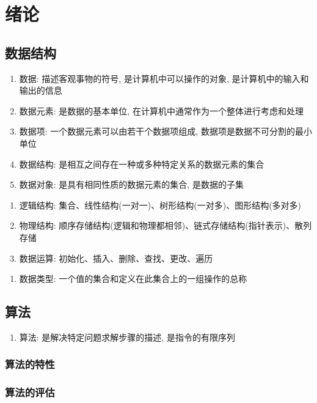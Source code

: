 \chapter{绪论}
\section{数据结构}
\begin{definition}[基本术语]
    \begin{enumerate}
        \item 数据: 描述客观事物的符号, 是计算机中可以操作的对象, 是计算机中的输入和输出的信息
        \item 数据元素: 是数据的基本单位, 在计算机中通常作为一个整体进行考虑和处理
        \item 数据项: 一个数据元素可以由若干个数据项组成, 数据项是数据不可分割的最小单位
        \item 数据结构: 是相互之间存在一种或多种特定关系的数据元素的集合
        \item 数据对象: 是具有相同性质的数据元素的集合, 是数据的子集
    \end{enumerate}
\end{definition}

\begin{definition}[数据结构三要素]
    \begin{enumerate}
        \item 逻辑结构: 集合、线性结构(一对一)、树形结构(一对多)、图形结构(多对多)
        \item 物理结构: 顺序存储结构(逻辑和物理都相邻)、链式存储结构(指针表示)、散列存储
        \item 数据运算: 初始化、插入、删除、查找、更改、遍历
    \end{enumerate}
\end{definition}

\begin{definition}[数据类型]
    \begin{enumerate}
        \item 数据类型: 一个值的集合和定义在此集合上的一组操作的总称
    \end{enumerate}
\end{definition}

\section{算法}

\begin{definition}[算法]
    \begin{enumerate}
        \item 算法: 是解决特定问题求解步骤的描述, 是指令的有限序列
    \end{enumerate}
\end{definition}

\subsection{算法的特性}

\subsection{算法的评估}
